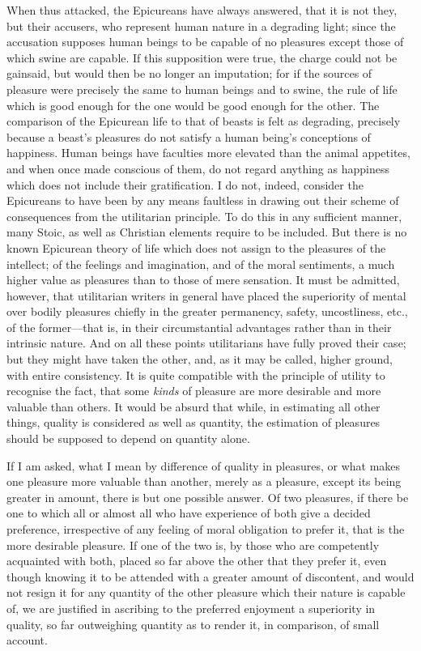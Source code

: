 \documentclass[12pt]{report}
\begin{document}
When thus attacked, the Epicureans have always answered, that it is not they, but their accusers, who represent human nature in a degrading light; since the accusation supposes human beings to be capable of no pleasures except those of which swine are capable. If this supposition were true, the charge could not be gainsaid, but would then be no longer an imputation; for if the sources of pleasure were precisely the same to human beings and to swine, the rule of life which is good enough for the one would be good enough for the other. The comparison of the Epicurean life to that of beasts is felt as degrading, precisely because a beast's pleasures do not satisfy a human being's conceptions of happiness. Human beings have faculties more elevated than the animal appetites, and when once made conscious of them, do not regard anything as happiness which does not include their gratification. I do not, indeed, consider the Epicureans to have been by any means faultless in drawing out their scheme of consequences from the utilitarian principle. To do this in any sufficient manner, many Stoic, as well as Christian elements require to be included. But there is no known Epicurean theory of life which does not assign to the pleasures of the intellect; of the feelings and imagination, and of the moral sentiments, a much higher value as pleasures than to those of mere sensation. It must be admitted, however, that utilitarian writers in general have placed the superiority of mental over bodily pleasures chiefly in the greater permanency, safety, uncostliness, etc., of the former—that is, in their circumstantial advantages rather than in their intrinsic nature. And on all these points utilitarians have fully proved their case; but they might have taken the other, and, as it may be called, higher ground, with entire consistency. It is quite compatible with the principle of utility to recognise the fact, that some \emph{kinds} of pleasure are more desirable and more valuable than others. It would be absurd that while, in estimating all other things, quality is considered as well as quantity, the estimation of pleasures should be supposed to depend on quantity alone.

If I am asked, what I mean by difference of quality in pleasures, or what makes one pleasure more valuable than another, merely as a pleasure, except its being greater in amount, there is but one possible answer. Of two pleasures, if there be one to which all or almost all who have experience of both give a decided preference, irrespective of any feeling of moral obligation to prefer it, that is the more desirable pleasure. If one of the two is, by those who are competently acquainted with both, placed so far above the other that they prefer it, even though knowing it to be attended with a greater amount of discontent, and would not resign it for any quantity of the other pleasure which their nature is capable of, we are justified in ascribing to the preferred enjoyment a superiority in quality, so far outweighing quantity as to render it, in comparison, of small account.
\end{document}
